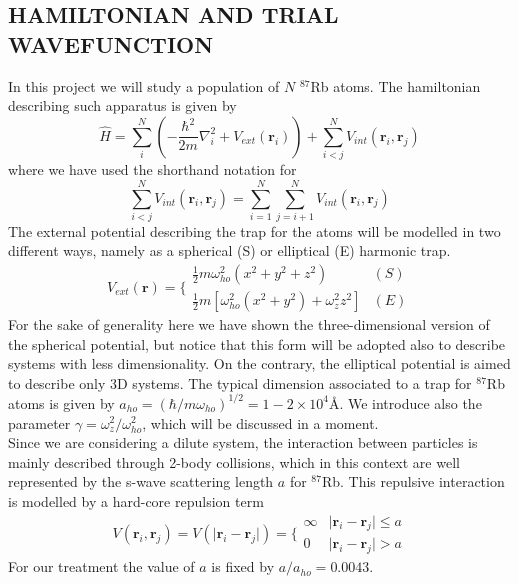 \subsection{HAMILTONIAN AND TRIAL WAVEFUNCTION}
In this project we will study a population of $N$ $^{87}$Rb atoms. The hamiltonian describing such apparatus is given by
\begin{equation}
    \hat{H} = \sum_i^N \left(-\frac{\hbar^2}{2m}{\nabla}_{i}^2 +V_{ext}({\mathbf{r}}_i)\right)  + \sum_{i<j}^{N} V_{int}({\mathbf{r}}_i,{\mathbf{r}}_j)
    \label{hamiltonian}
\end{equation}
where we have used the shorthand notation for
\begin{equation*}
    \sum_{i<j}^N V_{int}({\mathbf{r}}_i,{\mathbf{r}}_j)  = \sum_{i=1}^N \sum_{j=i+1}^N V_{int}({\mathbf{r}}_i,{\mathbf{r}}_j)
\end{equation*}
The external potential describing the trap for the atoms will be modelled in two different ways, namely as a spherical (S) or elliptical (E) harmonic trap. 
\begin{equation*}
    V_{ext}(\mathbf{r}) = \Bigg\{ 
    \begin{array}{ll} \frac{1}{2}m\omega_{ho}^2(x^2 + y^2 + z^2) & (S)\\ \frac{1}{2}m[\omega_{ho}^2(x^2+y^2) + \omega_z^2z^2] & (E) 
\end{array}
\end{equation*}
For the sake of generality here we have shown the three-dimensional version of the spherical potential, but notice that this form will be adopted also to describe systems with less dimensionality. On the contrary, the elliptical potential is aimed to describe only 3D systems. The typical dimension associated to a trap for $^{87}$Rb atoms is given by $a_{ho}= \left( \hbar /m \omega_{ho}\right)^{1/2} = 1-2 \times 10^{4}$\AA. We introduce also the parameter $\gamma=\omega_z^2/\omega_{ho}^2$, which will be discussed in a moment.\\

Since we are considering a dilute system, the interaction between particles is mainly described through 2-body collisions, which in this context are well represented by the s-wave scattering length $a$ for $^{87}$Rb. This repulsive interaction is modelled by a hard-core repulsion term
\begin{equation*}
    V(\bm{r}_i, \bm{r}_j) = V(\vert \bm{r}_i - \bm{r}_j \vert ) = \Bigg\{
    \begin{array}{ll}
        \infty &  \vert \bm{r}_i - \bm{r}_j \vert \leq a \\
        0 & \vert \bm{r}_i - \bm{r}_j \vert > a 
    \end{array}
\end{equation*}
For our treatment the value of $a$ is fixed by $a/a_{ho} = 0.0043$. \\

